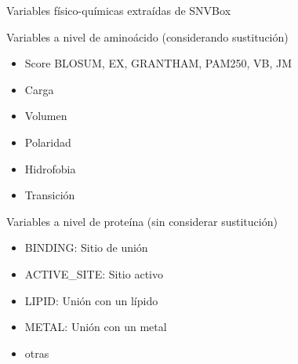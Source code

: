 \documentclass[
  spanish,
  ignorenonframetext,
]{beamer}
\providecommand{\tightlist}{%
  \setlength{\itemsep}{0pt}\setlength{\parskip}{0pt}}
\begin{document}
\begin{frame}{Variables físico-químicas extraídas de SNVBox}
\protect\hypertarget{variables-fuxedsico-quuxedmicas-extrauxeddas-de-snvbox}{}

\begin{block}{Variables a nivel de aminoácido (considerando
sustitución)}

\begin{itemize}
\tightlist
\item
  Score BLOSUM, EX, GRANTHAM, PAM250, VB, JM
\item
  Carga
\item
  Volumen
\item
  Polaridad
\item
  Hidrofobia
\item
  Transición
\end{itemize}

\end{block}

\begin{block}{Variables a nivel de proteína (sin considerar
sustitución)}

\begin{itemize}
\tightlist
\item
  BINDING: Sitio de unión
\item
  ACTIVE\_SITE: Sitio activo
\item
  LIPID: Unión con un lípido
\item
  METAL: Unión con un metal
\item
  otras
\end{itemize}

\end{block}

\end{frame}
\end{document}
